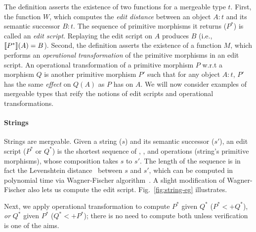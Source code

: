 The definition asserts the existence of two functions for a mergeable
type $t$. First, the function $W$, which computes the \emph{edit
distance} between an object $A:t$ and its semantic successor $B:t$.
The sequence of primitive morphisms it returns ($P^*$) is called an
\emph{edit script}. Replaying the edit script on $A$ produces $B$
(i.e., $\llbracket P^* \rrbracket(A) = B$). Second, the definition asserts the
existence of a function $M$, which performs an \emph{operational
transformation} of the primitive morphisms in an edit script. An
operational transformation of a primitive morphism $P$ w.r.t a
morphism $Q$ is another primitive morphism $P'$ such that for any
object $A:t$, $P'$ has the same \emph{effect} on $Q(A)$ as $P$ has on
$A$. We will now consider examples of mergeable types that reify the
notions of edit scripts and operational transformations.

\paragraph{Strings} Strings are mergeable. Given a string ($s$) and
its semantic successor ($s'$), an edit script ($P^*$ or $Q^*$) is the
shortest sequence of , , and 
operations (string's primitive morphisms), whose composition takes $s$
to $s'$. The length of the sequence is in fact the Levenshtein
distance~\cite{levenstein} between $s$ and $s'$, which can be computed
in polynomial time via Wagner-Fischer algorithm~\cite{wagner-fischer}.
A slight modification of Wagner-Fischer also lets us compute the edit
script. Fig.~\ref{fig:string-eg} illustrates.

Next, we apply operational transformation to compute $P^*$ given $Q^*$
($P^* <+ Q^*$), \emph{or} $Q^*$ given $P^*$ ($Q^* <+ P^*$); there is
no need to compute both unless verification is one of the aims. 


\paragraph{}



